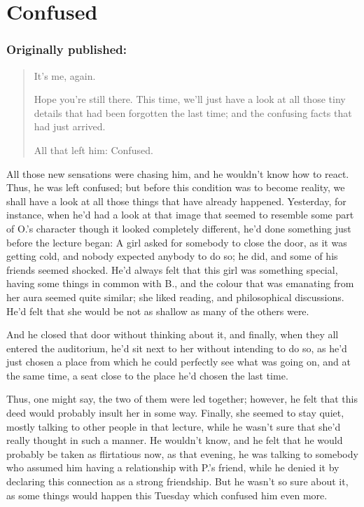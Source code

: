 \chapter{Confused}
\label{cha:confused}
\subsection*{Originally published: }
\begin{quote}
It's me, again. 

Hope you're still there. This time, we'll just have a look at all those tiny details that had been forgotten the last time; and the confusing facts that had just arrived.

All that left him: Confused.
\end{quote}

All those new sensations were chasing him, and he wouldn't know how to react. Thus, he was left confused; but before this condition was to become reality, we shall have a look at all those things that have already happened. Yesterday, for instance, when he'd had a look at that image that seemed to resemble some part of O.'s character though it looked completely different, he'd done something just before the lecture began: A girl asked for somebody to close the door, as it was getting cold, and nobody expected anybody to do so; he did, and some of his friends seemed shocked. He'd always felt that this girl was something special, having some things in common with B., and the colour that was emanating from her aura seemed quite similar; she liked reading, and philosophical discussions. He'd felt that she would be not as shallow as many of the others were.

And he closed that door without thinking about it, and finally, when they all entered the auditorium, he'd sit next to her without intending to do so, as he'd just chosen a place from which he could perfectly see what was going on, and at the same time, a seat close to the place he'd chosen the last time.

Thus, one might say, the two of them were led together; however, he felt that this deed would probably insult her in some way. Finally, she seemed to stay quiet, mostly talking to other people in that lecture, while he wasn't sure that she'd really thought in such a manner. He wouldn't know, and he felt that he would probably be taken as flirtatious now, as that evening, he was talking to somebody who assumed him having a relationship with P.'s friend, while he denied it by declaring this connection as a strong friendship. But he wasn't so sure about it, as some things would happen this Tuesday which confused him even more.

